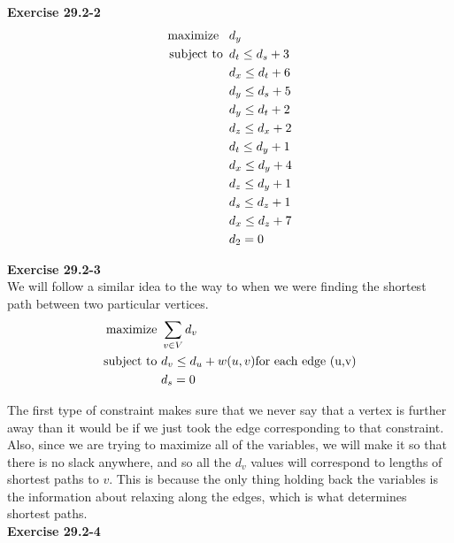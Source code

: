 \documentclass{article}
\begin{document}
\noindent\textbf{Exercise 29.2-2}\\

\begin{align*}
\mbox{maximize \,\,\,} & d_y\\
\mbox{subject to \,} & d_t \leq d_s + 3 \\
& d_x \leq d_t + 6 \\
& d_y \leq d_s + 5 \\
& d_y \leq d_t + 2 \\
& d_z \leq d_x + 2 \\
& d_t \leq d_y + 1 \\
& d_x \leq d_y + 4 \\
& d_z \leq d_y + 1 \\
& d_s \leq d_z + 1 \\
& d_x \leq d_z + 7 \\
& d_2 = 0
\end{align*}

\noindent\textbf{Exercise 29.2-3}\\

We will follow a similar idea to the way to when we were finding the shortest path between two particular vertices.
\begin{align*}
\hbox{maximize }&\sum_{v\in V} d_v\\
\hbox{subject to }& d_v\le d_u + w(u,v) \hbox{for each edge (u,v)}\\
&d_s =0
\end{align*}

The first type of constraint makes sure that we never say that a vertex is further away than it would be if we just took the edge corresponding to that constraint. Also, since we are trying to maximize all of the variables, we will make it so that there is no slack anywhere, and so all the $d_v$ values will correspond to lengths of shortest paths to $v$. This is because the only thing holding back the variables is the information about relaxing along the edges, which is what determines shortest paths.\\

\noindent\textbf{Exercise 29.2-4}\\
\end{document}
